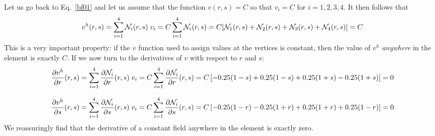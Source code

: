 Let us go back to Eq.~\eqref{bf01} and let us assume that the 
function $v(r,s)=C$ so that $v_i=C$ for $i=1,2,3,4$. 
It then follows that 
\[
v^h(r,s) = \sum_{i=1}^4 {\mathcal{N}}_i(r,s)\;  v_i 
=C \sum_{i=1}^4 {\mathcal{N}}_i(r,s)
=C [
{\mathcal{N}}_1(r,s)
+{\mathcal{N}}_2(r,s)
+{\mathcal{N}}_3(r,s)
+{\mathcal{N}}_4(r,s)]=C
\]
This is a very important property: if the $v$ function used to 
assign values at the vertices is constant, then 
the value of $v^h$ {\it anywhere} in the element is exactly $C$.
If we now turn to the derivatives of $v$ with respect to $r$ and $s$:
\[
\frac{\partial {v}^h}{\partial r}(r,s) 
= \sum_{i=1}^4 \frac{\partial {\mathcal{N}}_i}{\partial r}(r,s)\;  v_i 
= C \sum_{i=1}^4 \frac{\partial {\mathcal{N}}_i}{\partial r}(r,s) 
= C \left[ - 0.25(1-s)  + 0.25(1-s)  + 0.25(1+s)  - 0.25(1+s) \right] = 0 
\]

\[
\frac{\partial v^h}{\partial s}(r,s) 
= \sum_{i=1}^4 \frac{\partial {\mathcal{N}}_i}{\partial s}(r,s)\;  v_i 
= C \sum_{i=1}^4 \frac{\partial {\mathcal{N}}_i}{\partial s}(r,s) 
= C \left[ - 0.25(1-r) - 0.25(1+r) + 0.25(1+r) + 0.25(1-r) \right] = 0 
\]
We reassuringly find that the derivative of a constant field anywhere in the element is exactly zero.

